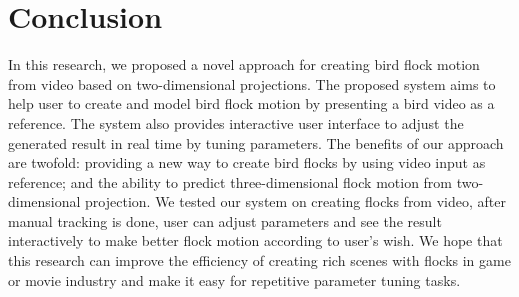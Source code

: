 \chapter{Conclusion}


In this research, we proposed a novel approach for creating bird flock motion from video based on two-dimensional projections. The proposed system aims to help user to create and model bird flock motion by presenting a bird video as a reference. The system also provides interactive user interface to adjust the generated result in real time by tuning parameters.
The benefits of our approach are twofold: providing a new way to create bird flocks by using video input as reference; and the ability to predict three-dimensional flock motion from two-dimensional projection. We tested our system on creating flocks from video, after manual tracking is done, user can adjust parameters and see the result interactively to make better flock motion according to user’s wish.
We hope that this research can improve the efficiency of creating rich scenes with flocks in game or movie industry and make it easy for repetitive parameter tuning tasks.

